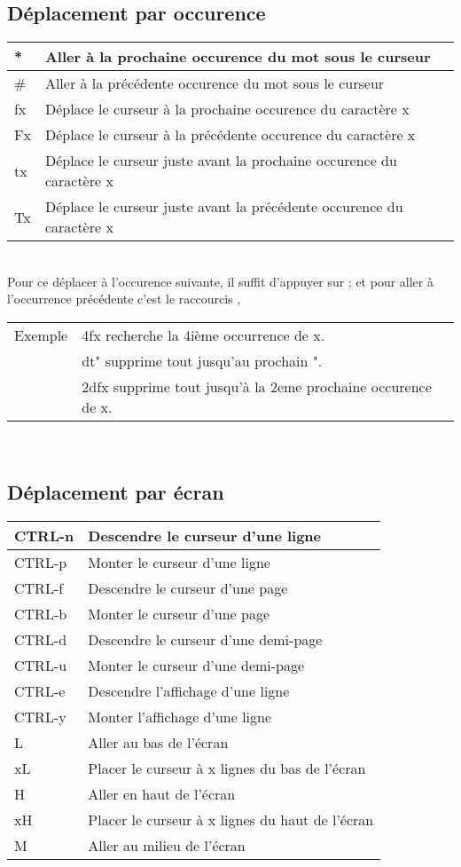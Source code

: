 \documentclass{article}
\begin{document}
\subsection{Déplacement par occurence}
\begin{tabular}{|p{3cm}| l| }
\hline
* & Aller à la prochaine occurence du mot sous le curseur \\ \hline
\# & Aller à la précédente occurence du mot sous le curseur \\ \hline
fx & Déplace le curseur à la prochaine occurence du caractère x \\ \hline
Fx & Déplace le curseur à la précédente occurence du caractère x \\ \hline
tx & Déplace le curseur juste avant la prochaine occurence du caractère x \\ \hline
Tx & Déplace le curseur juste avant la précédente occurence du caractère x \\ \hline
\end{tabular}\\

Pour ce déplacer à l'occurence suivante, il suffit d'appuyer sur ; et pour aller à l'occurrence précédente c'est le raccourcis ,
    
\begin{tabular}{l l}
Exemple&	4fx recherche la 4ième occurrence de x.\\
&dt" supprime tout jusqu'au prochain ".\\
&2dfx supprime tout jusqu'à la 2eme prochaine occurence de x.\\
\end{tabular}\\


\subsection{Déplacement par écran}
\begin{tabular}{|p{3cm}| l| }
\hline
CTRL-n & Descendre le curseur d'une ligne \\ \hline
CTRL-p & Monter le curseur d'une ligne\\ \hline
CTRL-f & Descendre le curseur d'une page\\ \hline
CTRL-b & Monter le curseur d'une page\\ \hline
CTRL-d & Descendre le curseur d'une demi-page\\ \hline
CTRL-u & Monter le curseur d'une demi-page\\ \hline
CTRL-e & Descendre l'affichage d'une ligne\\ \hline
CTRL-y & Monter l'affichage d'une ligne\\ \hline
L & Aller au bas de l'écran\\ \hline
xL & Placer le curseur à x lignes du bas de l'écran \\ \hline
H & Aller en haut de l'écran \\ \hline
xH & Placer le curseur à x lignes du haut de l'écran \\ \hline
M & Aller au milieu de l'écran\\ \hline
\end{tabular}\\
\end{document}
